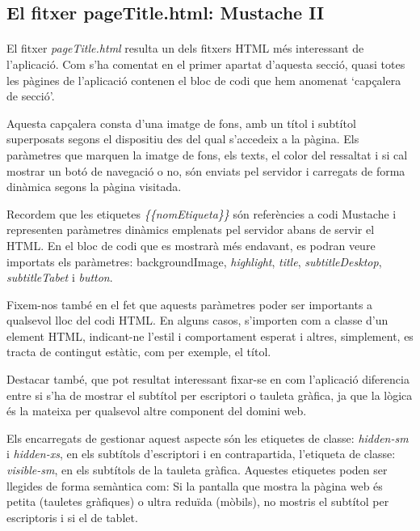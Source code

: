 \subsection{El fitxer pageTitle.html: Mustache II}

    \paragraph{}
    El fitxer \emph{pageTitle.html} resulta un dels fitxers HTML més interessant de l'aplicació. Com s'ha comentat en el primer apartat d'aquesta secció, quasi totes les pàgines de l'aplicació contenen el bloc de codi que hem anomenat `capçalera de secció'.

    Aquesta capçalera consta d'una imatge de fons, amb un títol i subtítol superposats segons el dispositiu des del qual s'accedeix a la pàgina. Els paràmetres que marquen la imatge de fons, els texts, el color del ressaltat i si cal mostrar un botó de navegació o no, són enviats pel servidor i carregats de forma dinàmica segons la pàgina visitada.

    Recordem que les etiquetes \emph{\{\{nomEtiqueta\}\}} són referències a codi Mustache i representen paràmetres dinàmics emplenats pel servidor abans de servir el HTML. En el bloc de codi que es mostrarà més endavant, es podran veure importats els paràmetres: backgroundImage, \emph{highlight}, \emph{title}, \emph{subtitleDesktop}, \emph{subtitleTabet} i \emph{button}.

    Fixem-nos també en el fet que aquests paràmetres poder ser importants a qualsevol lloc del codi HTML. En alguns casos, s'importen com a classe d'un element HTML, indicant-ne l'estil i comportament esperat i altres, simplement, es tracta de contingut estàtic, com per exemple, el títol.

    Destacar també, que pot resultat interessant fixar-se en com l'aplicació diferencia entre si s'ha de mostrar el subtítol per escriptori o tauleta gràfica, ja que la lògica és la mateixa per qualsevol altre component del domini web.

    Els encarregats de gestionar aquest aspecte són les etiquetes de classe: \emph{hidden-sm} i \emph{hidden-xs}, en els subtítols d'escriptori i en contrapartida, l'etiqueta de classe: \emph{visible-sm}, en els subtítols de la tauleta gràfica. Aquestes etiquetes poden ser llegides de forma semàntica com: Si la pantalla que mostra la pàgina web és petita (tauletes gràfiques) o ultra reduïda (mòbils), no mostris el subtítol per escriptoris i si el de tablet.

